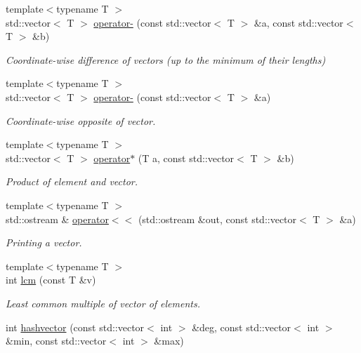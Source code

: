 \begin{DoxyCompactItemize}
{\footnotesize template$<$typename T $>$ }\\std\+::vector$<$ T $>$ \hyperlink{namespaceMackey_ae86e49097ef9a09ebcd0173881e88786}{operator-\/} (const std\+::vector$<$ T $>$ \&a, const std\+::vector$<$ T $>$ \&b)
\begin{DoxyCompactList}\small\item\em Coordinate-\/wise difference of vectors (up to the minimum of their lengths) \end{DoxyCompactList}\item 
{\footnotesize template$<$typename T $>$ }\\std\+::vector$<$ T $>$ \hyperlink{namespaceMackey_a9d67cfe3e93ac3ef2301547372b48e15}{operator-\/} (const std\+::vector$<$ T $>$ \&a)
\begin{DoxyCompactList}\small\item\em Coordinate-\/wise opposite of vector. \end{DoxyCompactList}\item 
{\footnotesize template$<$typename T $>$ }\\std\+::vector$<$ T $>$ \hyperlink{namespaceMackey_ae235ee5dd92dc1ca64388b8fbb1b4d75}{operator$\ast$} (T a, const std\+::vector$<$ T $>$ \&b)
\begin{DoxyCompactList}\small\item\em Product of element and vector. \end{DoxyCompactList}\item 
{\footnotesize template$<$typename T $>$ }\\std\+::ostream \& \hyperlink{namespaceMackey_aa4da3e3b46b9cb20f3be57d7e5da2d5d}{operator$<$$<$} (std\+::ostream \&out, const std\+::vector$<$ T $>$ \&a)
\begin{DoxyCompactList}\small\item\em Printing a vector. \end{DoxyCompactList}\item 
{\footnotesize template$<$typename T $>$ }\\int \hyperlink{namespaceMackey_a5d8ae76ffb9440e27bfca124d26ee1b2}{lcm} (const T \&v)
\begin{DoxyCompactList}\small\item\em Least common multiple of vector of elements. \end{DoxyCompactList}\item 
int \hyperlink{namespaceMackey_ae57418329a761aa68d26d68b637fe9dd}{hashvector} (const std\+::vector$<$ int $>$ \&deg, const std\+::vector$<$ int $>$ \&min, const std\+::vector$<$ int $>$ \&max)

\end{DoxyCompactItemize}
